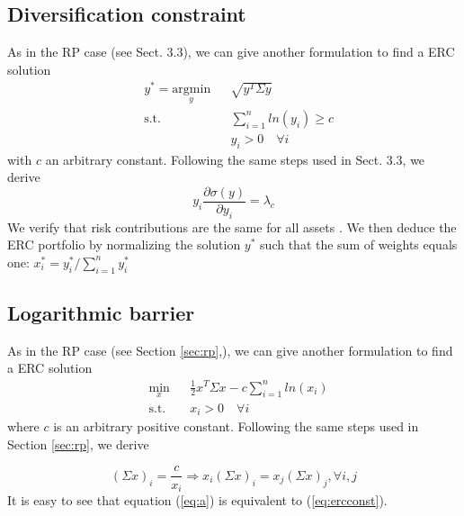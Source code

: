 \subsection{Diversification constraint}
As in the RP case (see Sect. 3.3), we can give another formulation to find a ERC solution
\begin{equation}\label{eq:dc}
\begin{aligned}
& y^* = \underset{y}{\text{argmin}}
&& \sqrt{y^T \Sigma y}\\
& \text{s.t.}
&&\sum_{i=1}^n ln(y_i) \geq c\\
&&&y_i > 0 \hspace{1em} \forall i
\end{aligned}
\end{equation}
with $c$ an arbitrary constant. Following the same steps used in Sect. 3.3, we derive 
\begin{equation}
y_i \frac{\partial\sigma(y)}{\partial y_i} = \lambda_c
\end{equation}
We verify that risk contributions are the same for all assets \cite{erc}. We then deduce the ERC portfolio by normalizing the solution $y^*$ such that the sum of weights equals one: $x_i^* =y_i^*/\sum_{i=1}^n y_i^*$

\subsection{Logarithmic barrier}
As in the RP case (see Section \ref{sec:rp},), we can give another formulation to find a ERC solution
\begin{equation}
\begin{aligned}
& \underset{x}{\text{min}}
&&\frac{1}{2} x^T \Sigma x - c \sum_{i=1}^{n} ln(x_i)\\
& \text{s.t.}
&& x_i > 0 \hspace{1em} \forall i
\end{aligned}
\end{equation}
where $c$ is an arbitrary positive constant. Following the same steps used in Section \ref{sec:rp}, we derive

\begin{equation}\label{eq:a}
(\Sigma x)_i = \frac{c}{x_i} \Rightarrow x_i(\Sigma x)_i = x_j(\Sigma x)_j, \forall i,j
\end{equation}
It is easy to see that equation (\ref{eq:a}) is equivalent to (\ref{eq:ercconst}). 

